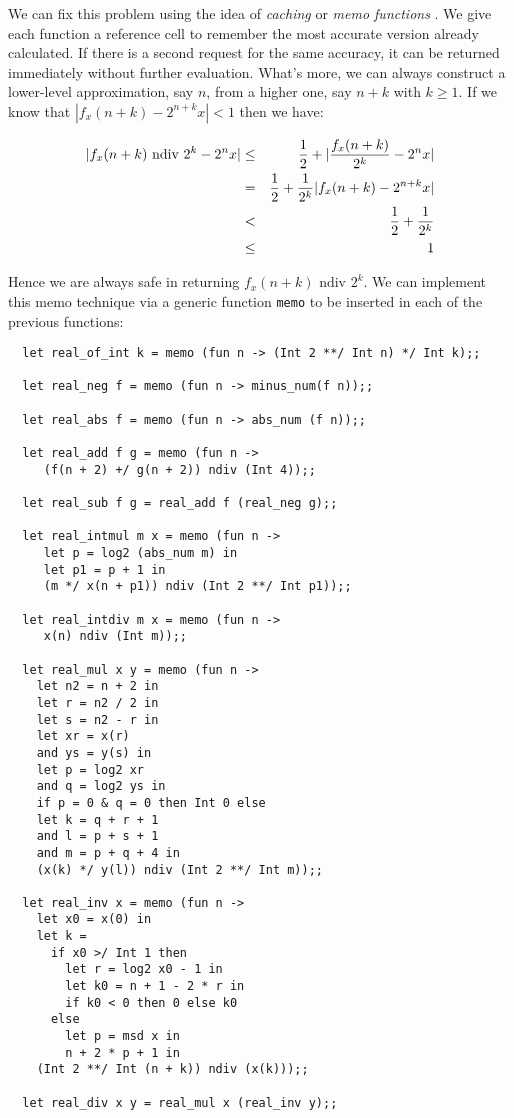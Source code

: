 We can fix this problem using the idea of {\em caching} or {\em memo
functions} \cite{michie-memo}. We give each function a reference cell to
remember the most accurate version already calculated. If there is a second
request for the same accuracy, it can be returned immediately without further
evaluation. What's more, we can always construct a lower-level approximation,
say $n$, from a higher one, say $n + k$ with $k \geq 1$. If we know that
$|f_x(n + k) - 2^{n + k} x| < 1$ then we have:

\begin{eqnarray*}
|f_x(n + k) \mbox{ ndiv } 2^ k - 2^n x|
& \leq & {1 \over 2} + |{f_x(n + k) \over 2^k} - 2^n x|                 \\
& =    & {1 \over 2} + {1 \over 2^k} |f_x(n + k) - 2^{n + k} x|         \\
& <    & {1 \over 2} + {1 \over 2^k}                                    \\
& \leq & 1
\end{eqnarray*}

Hence we are always safe in returning $f_x(n + k) \mbox{ ndiv } 2^k$. We can
implement this memo technique via a generic function {\tt memo} to be inserted
in each of the previous functions:

\begin{boxed}\begin{verbatim}
  let real_of_int k = memo (fun n -> (Int 2 **/ Int n) */ Int k);;

  let real_neg f = memo (fun n -> minus_num(f n));;

  let real_abs f = memo (fun n -> abs_num (f n));;

  let real_add f g = memo (fun n ->
     (f(n + 2) +/ g(n + 2)) ndiv (Int 4));;

  let real_sub f g = real_add f (real_neg g);;

  let real_intmul m x = memo (fun n ->
     let p = log2 (abs_num m) in
     let p1 = p + 1 in
     (m */ x(n + p1)) ndiv (Int 2 **/ Int p1));;

  let real_intdiv m x = memo (fun n ->
     x(n) ndiv (Int m));;

  let real_mul x y = memo (fun n ->
    let n2 = n + 2 in
    let r = n2 / 2 in
    let s = n2 - r in
    let xr = x(r)
    and ys = y(s) in
    let p = log2 xr
    and q = log2 ys in
    if p = 0 & q = 0 then Int 0 else
    let k = q + r + 1
    and l = p + s + 1
    and m = p + q + 4 in
    (x(k) */ y(l)) ndiv (Int 2 **/ Int m));;

  let real_inv x = memo (fun n ->
    let x0 = x(0) in
    let k =
      if x0 >/ Int 1 then
        let r = log2 x0 - 1 in
        let k0 = n + 1 - 2 * r in
        if k0 < 0 then 0 else k0
      else
        let p = msd x in
        n + 2 * p + 1 in
    (Int 2 **/ Int (n + k)) ndiv (x(k)));;

  let real_div x y = real_mul x (real_inv y);;
\end{verbatim}\end{boxed}

